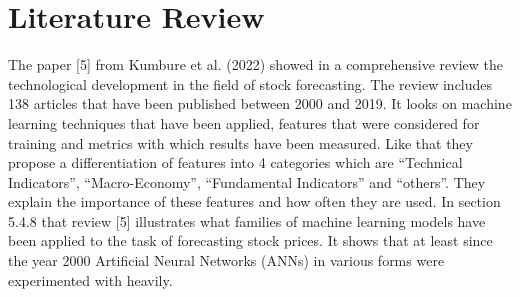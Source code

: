 \documentclass[a4paper,12pt]{report}
\begin{document}
\chapter{Literature Review}
The paper [5] from Kumbure et al. (2022) showed in a comprehensive review the technological development in the field of stock forecasting. The review includes 138 articles that have been published between 2000 and 2019. It looks on machine learning techniques that have been applied, features that were considered for training and metrics with which results have been measured. Like that they propose a differentiation of features into 4 categories which are “Technical Indicators”, “Macro-Economy”, “Fundamental Indicators” and “others”. They explain the importance of these features and how often they are used. In section 5.4.8 that review [5] illustrates what families of machine learning models have been applied to the task of forecasting stock prices. It shows that at least since the year 2000 Artificial Neural Networks (ANNs) in various forms were experimented with heavily. \\
\\\
\end{document}
